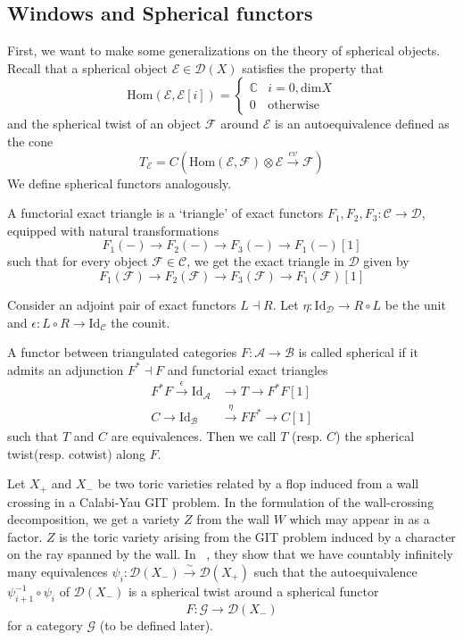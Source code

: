 \subsection{Windows and Spherical functors}

First, we want to make some generalizations on the theory of spherical objects. Recall that a spherical object $\mathcal{E} \in \mathcal{D}(X)$ satisfies the property that $$\mathrm{Hom}(\mathcal{E}, \mathcal{E}[i])= \begin{cases}
\mathbb{C} & i=0,\mathrm{dim}X  \\
0 & \text{otherwise}
\end{cases}$$
and the spherical twist of an object $\mathcal{F}$ around $\mathcal{E}$ is an autoequivalence defined as the cone $$T_\mathcal{E} = C(\mathrm{Hom}(\mathcal{E},\mathcal{F})\otimes \mathcal{E}\xrightarrow{ev} \mathcal{F})$$
We define spherical functors analogously.

\begin{definition}{}{}
	A functorial exact triangle is a `triangle' of exact functors $F_{1}, F_{2}, F_{3} : \mathcal{C}\to \mathcal{D}$,    equipped with natural transformations $$
F_{1}(-)\to F_{2}(-)\to F_{3}(-)\to F_{1}(-)[1]
$$ such that for every object $\mathcal{F}\in \mathcal{C}$,   we get the exact triangle in $\mathcal{D}$ given by $$
F_{1}(\mathcal{F})\to F_{2}(\mathcal{F})\to F_{3}(\mathcal{F})\to F_{1}(\mathcal{F})[1]
$$
\end{definition}

Consider an adjoint pair of exact functors $L \dashv R$. Let $\eta : \mathrm{Id}_\mathcal{D}\to R\circ L$ be the unit and $\epsilon : L\circ R \to \mathrm{Id}_\mathcal{C}$ the counit. 

\begin{definition}{}{}
A functor between triangulated categories $F: \mathcal{A}\to \mathcal{B}$ is called spherical if it admits an adjunction $F^{*}\dashv F$ and  functorial exact triangles 
\begin{align*}
F^{*}F \xrightarrow{\epsilon} \mathrm{Id}_\mathcal{A}&\to T \to F^{*}F [1] \\
C\to \mathrm{Id}_\mathcal{B}&\xrightarrow{\eta} F F^{*}\to C[1]
\end{align*} such that $T$ and $C$ are equivalences. Then we call $T$ (resp. $C$) the spherical twist(resp. cotwist) along $F$. 
\end{definition}

Let $X_+$ and $X_-$ be two toric varieties related by a flop induced from a wall crossing in a Calabi-Yau GIT problem. In the formulation of the wall-crossing decomposition, we get a variety $Z$ from the wall $W$ which may appear in as a factor. $Z$ is the toric variety arising from the GIT problem induced by a character on the ray spanned by the wall. In ~\cite{halpernleistner2016autoequivalences}, they show that we have countably infinitely many equivalences $\psi_{i}: \mathcal{D}(X_{-})\xrightarrow{\sim} \mathcal{D}(X_{+})$  such that the autoequivalence $\psi_{i+1}^{-1}\circ \psi_i$ of $\mathcal{D}(X_{-})$ is a spherical twist around a spherical functor $$F : \mathcal{G}\to \mathcal{D}(X_{-})$$ for a category $\mathcal{G}$ (to be defined later).

